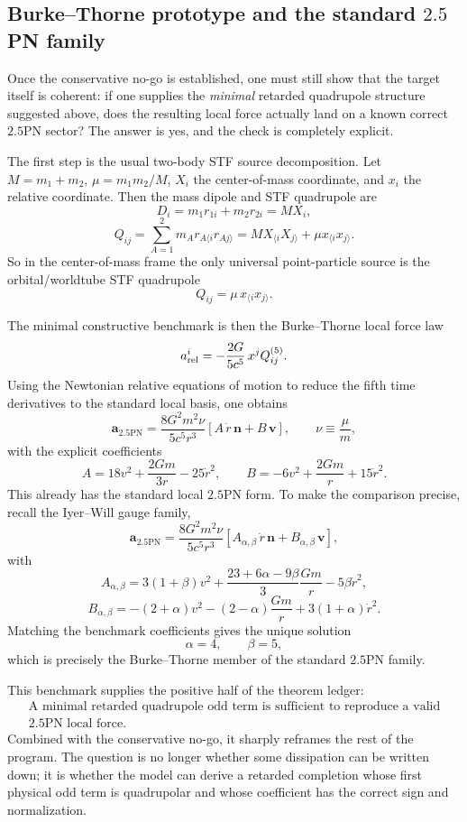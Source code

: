 \documentclass[11pt]{article}
\begin{document}
\subsection{Burke--Thorne prototype and the standard \texorpdfstring{$2.5$}{2.5}PN family}
\label{sec:benchmark-framework-bt}

Once the conservative no-go is established, one must still show that the target
itself is coherent: if one supplies the \emph{minimal} retarded quadrupole
structure suggested above, does the resulting local force actually land on a
known correct $2.5$PN sector?  The answer is yes, and the check is completely
explicit.

The first step is the usual two-body STF source decomposition.  Let $M=m_1+m_2$,
$\mu=m_1m_2/M$, $X_i$ the center-of-mass coordinate, and $x_i$ the relative
coordinate.  Then the mass dipole and STF quadrupole are
\[
D_i = m_1 r_{1i}+m_2 r_{2i}=M X_i,
\]
\[
Q_{ij}
=
\sum_{A=1}^2 m_A r_{A\langle i}r_{A j\rangle}
=
M X_{\langle i}X_{j\rangle} + \mu x_{\langle i}x_{j\rangle}.
\]
So in the center-of-mass frame the only universal point-particle source is the
orbital/worldtube STF quadrupole
\[
Q_{ij}=\mu\,x_{\langle i}x_{j\rangle}.
\]

The minimal constructive benchmark is then the Burke--Thorne local force law
\[
a_{\rm rel}^i
=
-\frac{2G}{5c^5}\,x^j Q^{(5)}_{ij}.
\]
Using the Newtonian relative equations of motion to reduce the fifth time
derivatives to the standard local basis, one obtains
\[
\mathbf a_{2.5\mathrm{PN}}
=
\frac{8G^2m^2\nu}{5c^5r^3}
\left[
A\,\dot r\,\mathbf n + B\,\mathbf v
\right],
\qquad
\nu\equiv \frac{\mu}{m},
\]
with the explicit coefficients
\[
A = 18v^2 + \frac{2Gm}{3r} - 25\dot r^2,
\qquad
B = -6v^2 + \frac{2Gm}{r} + 15\dot r^2.
\]
This already has the standard local $2.5$PN form.  To make the comparison
precise, recall the Iyer--Will gauge family,
\[
\mathbf a_{2.5\mathrm{PN}}
=
\frac{8G^2m^2\nu}{5c^5r^3}
\left[
A_{\alpha,\beta}\,\dot r\,\mathbf n + B_{\alpha,\beta}\,\mathbf v
\right],
\]
with
\[
A_{\alpha,\beta}
=
3(1+\beta)v^2
+ \frac{23+6\alpha-9\beta}{3}\frac{Gm}{r}
-5\beta\dot r^2,
\]
\[
B_{\alpha,\beta}
=
-(2+\alpha)v^2
-(2-\alpha)\frac{Gm}{r}
+3(1+\alpha)\dot r^2.
\]
Matching the benchmark coefficients gives the unique solution
\[
\alpha=4,
\qquad
\beta=5,
\]
which is precisely the Burke--Thorne member of the standard $2.5$PN family.

This benchmark supplies the positive half of the theorem ledger:
\[
\boxed{\begin{gathered}
\text{A minimal retarded quadrupole odd term is sufficient to reproduce a valid}\\
2.5\text{PN local force.}
\end{gathered}}
\]
Combined with the conservative no-go, it sharply reframes the rest of the
program.  The question is no longer whether some dissipation can be written down;
it is whether the model can derive a retarded completion whose first physical odd
term is quadrupolar and whose coefficient has the correct sign and normalization.
\end{document}
